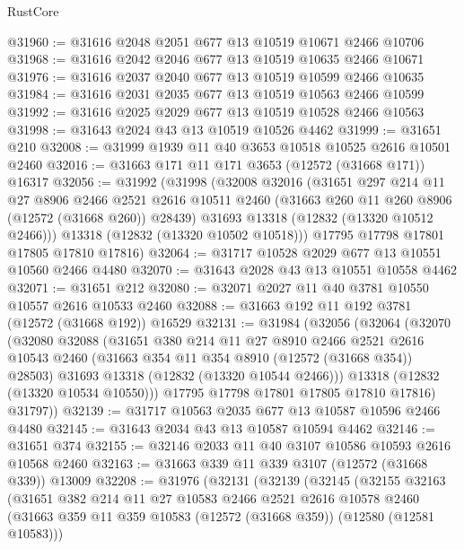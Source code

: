 \begin{lexlean}{RustCore}
\begin{coremodule}
@31960 := @31616 @2048 @2051 @677 @13 @10519 @10671 @2466 @10706
@31968 := @31616 @2042 @2046 @677 @13 @10519 @10635 @2466 @10671
@31976 := @31616 @2037 @2040 @677 @13 @10519 @10599 @2466 @10635
@31984 := @31616 @2031 @2035 @677 @13 @10519 @10563 @2466 @10599
@31992 := @31616 @2025 @2029 @677 @13 @10519 @10528 @2466 @10563
@31998 := @31643 @2024 @43 @13 @10519 @10526 @4462
@31999 := @31651 @210
@32008 := @31999 @1939 @11 @40 @3653 @10518 @10525 @2616 @10501 @2460
@32016 := @31663 @171 @11 @171 @3653 (@12572 (@31668 @171)) @16317
@32056 := @31992
    (@31998
      (@32008
        @32016
        (@31651
          @297
          @214
          @11
          @27
          @8906
          @2466
          @2521
          @2616
          @10511
          @2460
          (@31663 @260 @11 @260 @8906 (@12572 (@31668 @260)) @28439)
          @31693
          @13318
          (@12832 (@13320 @10512 @2466)))
        @13318
        (@12832 (@13320 @10502 @10518)))
      @17795
      @17798
      @17801
      @17805
      @17810
      @17816)
@32064 := @31717 @10528 @2029 @677 @13 @10551 @10560 @2466 @4480
@32070 := @31643 @2028 @43 @13 @10551 @10558 @4462
@32071 := @31651 @212
@32080 := @32071 @2027 @11 @40 @3781 @10550 @10557 @2616 @10533 @2460
@32088 := @31663 @192 @11 @192 @3781 (@12572 (@31668 @192)) @16529
@32131 := @31984
    (@32056
      (@32064
        (@32070
          (@32080
            @32088
            (@31651
              @380
              @214
              @11
              @27
              @8910
              @2466
              @2521
              @2616
              @10543
              @2460
              (@31663 @354 @11 @354 @8910 (@12572 (@31668 @354)) @28503)
              @31693
              @13318
              (@12832 (@13320 @10544 @2466)))
            @13318
            (@12832 (@13320 @10534 @10550)))
          @17795
          @17798
          @17801
          @17805
          @17810
          @17816)
        @31797))
@32139 := @31717 @10563 @2035 @677 @13 @10587 @10596 @2466 @4480
@32145 := @31643 @2034 @43 @13 @10587 @10594 @4462
@32146 := @31651 @374
@32155 := @32146 @2033 @11 @40 @3107 @10586 @10593 @2616 @10568 @2460
@32163 := @31663 @339 @11 @339 @3107 (@12572 (@31668 @339)) @13009
@32208 := @31976
    (@32131
      (@32139
        (@32145
          (@32155
            @32163
            (@31651
              @382
              @214
              @11
              @27
              @10583
              @2466
              @2521
              @2616
              @10578
              @2460
              (@31663 @359 @11 @359 @10583 (@12572 (@31668 @359)) (@12580 (@12581 @10583)))

\end{coremodule}
\end{lexlean}
